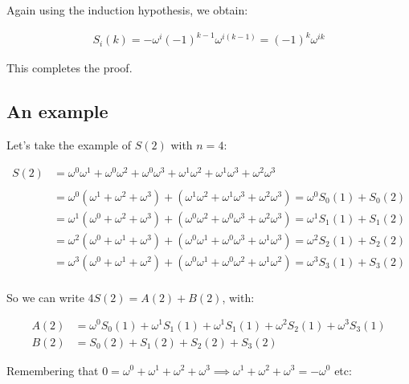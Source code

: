\documentclass[a4paper]{article}
\begin{document}
Again using the induction hypothesis, we obtain:

\begin{equation}
  \begin{aligned}
    S_i(k) = - \omega^i (-1)^{k-1} \omega^{i(k-1)} = (-1)^k \omega^{ik}
  \end{aligned}
\end{equation}

This completes the proof.

\subsection{An example}

Let's take the example of $S(2)$ with $n = 4$:

\begin{equation}
  \begin{aligned}
    S(2) &= \omega^0\omega^1 + \omega^0\omega^2 + \omega^0\omega^3 + \omega^1\omega^2 + \omega^1\omega^3 + \omega^2\omega^3 \\
         \\
         &= \omega^0 (\omega^1 + \omega^2 + \omega^3) +  (\omega^1\omega^2 + \omega^1\omega^3 + \omega^2\omega^3) = \omega^0 S_0(1) + S_0(2) \\
         &= \omega^1 (\omega^0 + \omega^2 + \omega^3) +  (\omega^0\omega^2 + \omega^0\omega^3 + \omega^2\omega^3) = \omega^1 S_1(1) + S_1(2) \\
         &= \omega^2 (\omega^0 + \omega^1 + \omega^3) +  (\omega^0\omega^1 + \omega^0\omega^3 + \omega^1\omega^3) = \omega^2 S_2(1) + S_2(2) \\
         &= \omega^3 (\omega^0 + \omega^1 + \omega^2) +  (\omega^0\omega^1 + \omega^0\omega^2 + \omega^1\omega^2) = \omega^3 S_3(1) + S_3(2) \\
  \end{aligned}
\end{equation}

So we can write $4S(2) = A(2) + B(2)$, with:

\begin{equation}
  \begin{aligned}
    A(2) &= \omega^0 S_0(1) + \omega^1 S_1(1) + \omega^1 S_1(1) + \omega^2 S_2(1) + \omega^3 S_3(1) \\
    B(2) &= S_0(2) + S_1(2) + S_2(2) + S_3(2)
  \end{aligned}
\end{equation}

Remembering that $0 = \omega^0 + \omega^1 + \omega^2 + \omega^3 \implies \omega^1 + \omega^2 + \omega^3 = -\omega^0$ etc:
\end{document}
